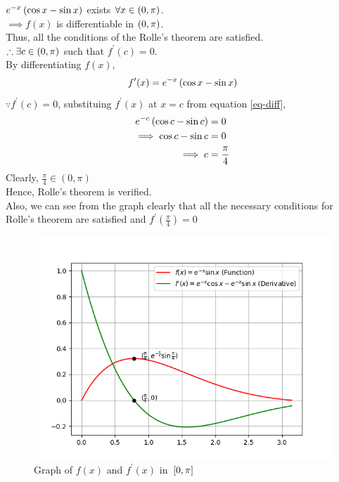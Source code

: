 \documentclass[journal,12pt,twocolumn]{IEEEtran}
\begin{document}
$e^{-x} \left(\cos x - \sin x\right)$ exists $\forall x \in \left(0,\pi\right)$.\\
$\implies f(x)$ is differentiable in $\left(0,\pi\right)$.\\
Thus, all the conditions of the Rolle's theorem are satisfied.\\
$\therefore \exists c \in \left(0, \pi\right)$ such that $f^\prime(c) = 0$.\\
By differentiating $f(x)$, 
\begin{align}
    \label{eq-diff}
    f^\prime (x) = e^{-x}\left(\cos x - \sin x\right)
\end{align}
$\because f^\prime(c) = 0$, substituing $f^\prime(x)$ at $x=c$ from equation \eqref{eq-diff},
\begin{align}
    e^{-c} \left(\cos c - \sin c\right) &= 0
    \\
    \implies \cos c - \sin c &= 0
    \\
    \implies c &= \frac{\pi}{4}
\end{align}
Clearly, $\frac{\pi}{4} \in (0,\pi)$\\
Hence, Rolle's theorem is verified.\\
Also, we can see from the graph clearly that all the necessary conditions for Rolle's theorem are satisfied and $f^\prime(\frac{\pi}{4}) = 0$
\begin{figure}[ht!]
	  \centering 
	  \includegraphics[width=\columnwidth]{Figs/Figure_1.png}
	  \caption{Graph of $f(x)$ and $f^\prime(x)$ in ${}\left[0,\pi\right]$}
	  \label{fig-1}
\end{figure}
\end{document}
